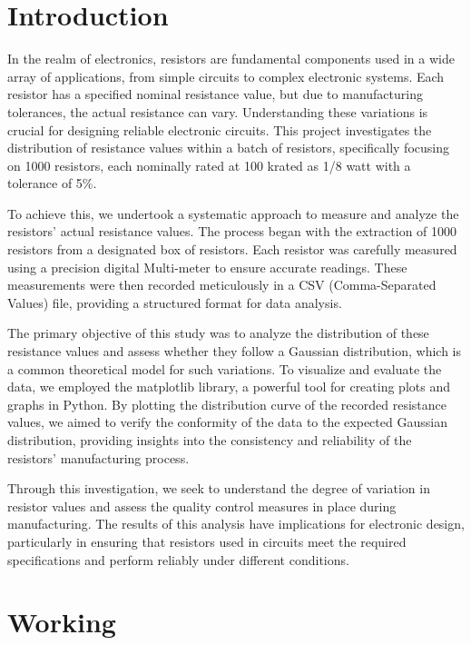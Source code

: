 \documentclass[12pt]{article}
\begin{document}
\section{Introduction}
\label{sec:data}
In the realm of electronics, resistors are fundamental components used in a wide array of applications, from simple circuits to complex electronic systems. Each resistor has a specified nominal resistance value, but due to manufacturing tolerances, the actual resistance can vary. Understanding these variations is crucial for designing reliable electronic circuits. This project investigates the distribution of resistance values within a batch of resistors, specifically focusing on 1000 resistors, each nominally rated at 100 k\textohm rated as 1/8 watt with a tolerance of 5\%.

To achieve this, we undertook a systematic approach to measure and analyze the resistors' actual resistance values. The process began with the extraction of 1000 resistors from a designated box of resistors. Each resistor was carefully measured using a precision digital Multi-meter to ensure accurate readings. These measurements were then recorded meticulously in a CSV (Comma-Separated Values) file, providing a structured format for data analysis.

The primary objective of this study was to analyze the distribution of these resistance values and assess whether they follow a Gaussian distribution, which is a common theoretical model for such variations. To visualize and evaluate the data, we employed the matplotlib library, a powerful tool for creating plots and graphs in Python. By plotting the distribution curve of the recorded resistance values, we aimed to verify the conformity of the data to the expected Gaussian distribution, providing insights into the consistency and reliability of the resistors' manufacturing process.

Through this investigation, we seek to understand the degree of variation in resistor values and assess the quality control measures in place during manufacturing. The results of this analysis have implications for electronic design, particularly in ensuring that resistors used in circuits meet the required specifications and perform reliably under different conditions.

 
\newpage
\section{Working}
\label{chap:results}
\raggedright
\end{document}
